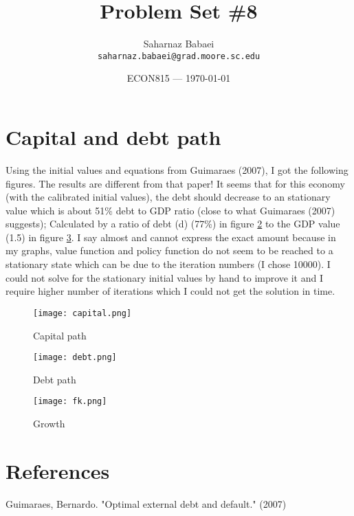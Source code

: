 \documentclass{article}
\title{Problem Set \#8} %
\author{Saharnaz Babaei\\ \texttt{saharnaz.babaei@grad.moore.sc.edu}} %
\date{ECON815 --- \today} %
\begin{document}
\maketitle %


\section*{Capital and debt path} %

Using the initial values and equations from Guimaraes (2007), I got the following figures. The results are different from that paper! It seems that for this economy (with the calibrated initial values), the debt should decrease to an stationary value which is about 51\% debt to GDP ratio (close to what Guimaraes (2007) suggests); Calculated by a ratio of debt (d) (77\%) in figure \ref{debt} to the GDP value (1.5) in figure \ref{fk}. I say almost and cannot express the exact amount because in my graphs, value function and policy function do not seem to be reached to a stationary state which can be due to the iteration numbers (I chose 10000). I could not solve for the stationary initial values by hand to improve it and I require higher number of iterations which I could not get the solution in time. 

\begin{figure}[htbp]
	\begin{center}
		\texttt{[image: capital.png]}
		\caption{Capital path}
		\label{capital}
	\end{center}
\end{figure}

\begin{figure}[htbp]
	\begin{center}
		\texttt{[image: debt.png]}
		\caption{Debt path}
		\label{debt}
	\end{center}
\end{figure}

\begin{figure}[htbp]
	\begin{center}
		\texttt{[image: fk.png]}
		\caption{Growth}
		\label{fk}
	\end{center}
\end{figure}


\section*{References}
Guimaraes, Bernardo. "Optimal external debt and default." (2007)
\end{document}
